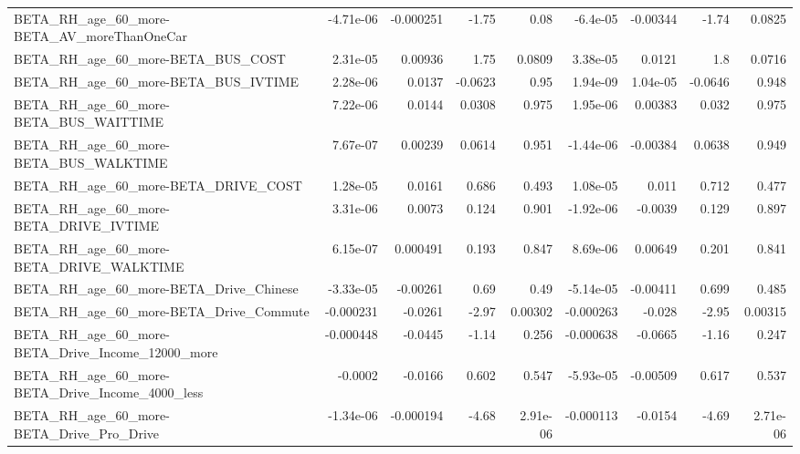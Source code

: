 \begin{tabular}{lrrrrrrrr}
BETA\_RH\_age\_60\_more-BETA\_AV\_moreThanOneCar         &   -4.71e-06 &    -0.000251 &     -1.75 &     0.08 &   -6.4e-05 &    -0.00344 &        -1.74 &        0.0825 \\
BETA\_RH\_age\_60\_more-BETA\_BUS\_COST                  &    2.31e-05 &      0.00936 &      1.75 &   0.0809 &   3.38e-05 &      0.0121 &          1.8 &        0.0716 \\
BETA\_RH\_age\_60\_more-BETA\_BUS\_IVTIME                &    2.28e-06 &       0.0137 &   -0.0623 &     0.95 &   1.94e-09 &    1.04e-05 &      -0.0646 &         0.948 \\
BETA\_RH\_age\_60\_more-BETA\_BUS\_WAITTIME              &    7.22e-06 &       0.0144 &    0.0308 &    0.975 &   1.95e-06 &     0.00383 &        0.032 &         0.975 \\
BETA\_RH\_age\_60\_more-BETA\_BUS\_WALKTIME              &    7.67e-07 &      0.00239 &    0.0614 &    0.951 &  -1.44e-06 &    -0.00384 &       0.0638 &         0.949 \\
BETA\_RH\_age\_60\_more-BETA\_DRIVE\_COST                &    1.28e-05 &       0.0161 &     0.686 &    0.493 &   1.08e-05 &       0.011 &        0.712 &         0.477 \\
BETA\_RH\_age\_60\_more-BETA\_DRIVE\_IVTIME              &    3.31e-06 &       0.0073 &     0.124 &    0.901 &  -1.92e-06 &     -0.0039 &        0.129 &         0.897 \\
BETA\_RH\_age\_60\_more-BETA\_DRIVE\_WALKTIME            &    6.15e-07 &     0.000491 &     0.193 &    0.847 &   8.69e-06 &     0.00649 &        0.201 &         0.841 \\
BETA\_RH\_age\_60\_more-BETA\_Drive\_Chinese             &   -3.33e-05 &     -0.00261 &      0.69 &     0.49 &  -5.14e-05 &    -0.00411 &        0.699 &         0.485 \\
BETA\_RH\_age\_60\_more-BETA\_Drive\_Commute             &   -0.000231 &      -0.0261 &     -2.97 &  0.00302 &  -0.000263 &      -0.028 &        -2.95 &       0.00315 \\
BETA\_RH\_age\_60\_more-BETA\_Drive\_Income\_12000\_more   &   -0.000448 &      -0.0445 &     -1.14 &    0.256 &  -0.000638 &     -0.0665 &        -1.16 &         0.247 \\
BETA\_RH\_age\_60\_more-BETA\_Drive\_Income\_4000\_less    &     -0.0002 &      -0.0166 &     0.602 &    0.547 &  -5.93e-05 &    -0.00509 &        0.617 &         0.537 \\
BETA\_RH\_age\_60\_more-BETA\_Drive\_Pro\_Drive           &   -1.34e-06 &    -0.000194 &     -4.68 & 2.91e-06 &  -0.000113 &     -0.0154 &        -4.69 &      2.71e-06 \\

\end{tabular}
